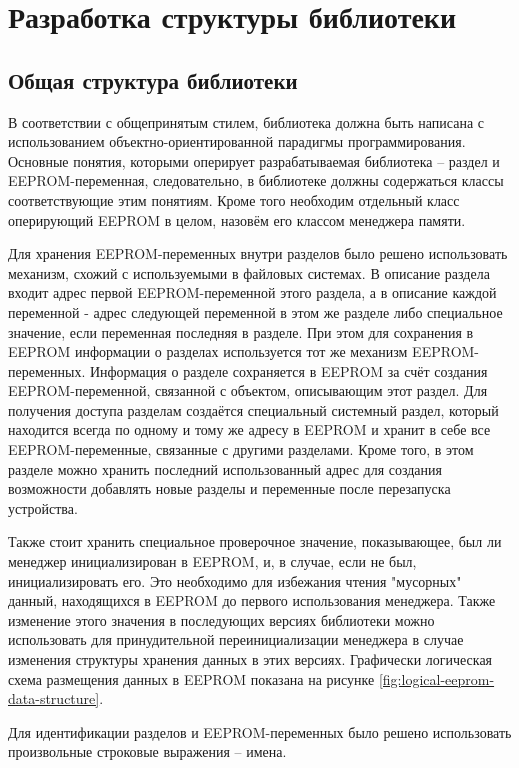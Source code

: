 \section{Разработка структуры библиотеки}

\subsection{Общая структура библиотеки} \label{subsection:library-structure}

В соответствии с общепринятым стилем, библиотека должна быть написана с использованием объектно-ориентированной парадигмы программирования.
Основные понятия, которыми оперирует разрабатываемая библиотека -- раздел и EEPROM-переменная, следовательно, в библиотеке должны содержаться классы соответствующие этим понятиям.
Кроме того необходим отдельный класс оперирующий EEPROM в целом, назовём его классом менеджера памяти.

Для хранения EEPROM-переменных внутри разделов было решено использовать механизм, схожий с используемыми в файловых системах.
В описание раздела входит адрес первой EEPROM-переменной этого раздела, а в описание каждой переменной - адрес следующей переменной в этом же разделе либо специальное значение, если переменная последняя в разделе.
При этом для сохранения в EEPROM информации о разделах используется тот же механизм EEPROM-переменных.
Информация о разделе сохраняется в EEPROM за счёт создания EEPROM-переменной, связанной с объектом, описывающим этот раздел.
Для получения доступа разделам создаётся специальный системный раздел, который находится всегда по одному и тому же адресу в EEPROM и хранит в себе все EEPROM-переменные, связанные с другими разделами.
Кроме того, в этом разделе можно хранить последний использованный адрес для создания возможности добавлять новые разделы и переменные после перезапуска устройства.

Также стоит хранить специальное проверочное значение, показывающее, был ли менеджер инициализирован в EEPROM, и, в случае, если не был, инициализировать его.
Это необходимо для избежания чтения "мусорных" данный, находящихся в EEPROM до первого использования менеджера.
Также изменение этого значения в последующих версиях библиотеки можно использовать для принудительной переинициализации менеджера в случае изменения структуры хранения данных в этих версиях.
Графически логическая схема размещения данных в EEPROM показана на рисунке \ref{fig:logical-eeprom-data-structure}.

Для идентификации разделов и EEPROM-переменных было решено использовать произвольные строковые выражения -- имена.


